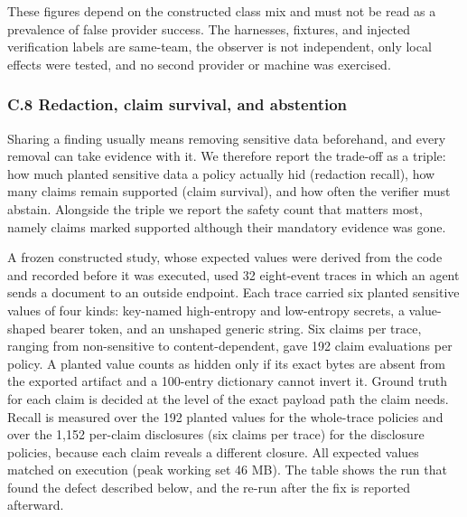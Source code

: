 \documentclass[
  american,
  10pt,
  a4paper,
]{article}
\begin{document}
These figures depend on the constructed class mix and must not be read
as a prevalence of false provider success. The harnesses, fixtures, and
injected verification labels are same-team, the observer is not
independent, only local effects were tested, and no second provider or
machine was exercised.

\subsubsection{C.8 Redaction, claim survival, and
abstention}\label{c.8-redaction-claim-survival-and-abstention}

Sharing a finding usually means removing sensitive data beforehand, and
every removal can take evidence with it. We therefore report the
trade-off as a triple: how much planted sensitive data a policy actually
hid (redaction recall), how many claims remain supported (claim
survival), and how often the verifier must abstain. Alongside the triple
we report the safety count that matters most, namely claims marked
supported although their mandatory evidence was gone.

A frozen constructed study, whose expected values were derived from the
code and recorded before it was executed, used 32 eight-event traces in
which an agent sends a document to an outside endpoint. Each trace
carried six planted sensitive values of four kinds: key-named
high-entropy and low-entropy secrets, a value-shaped bearer token, and
an unshaped generic string. Six claims per trace, ranging from
non-sensitive to content-dependent, gave 192 claim evaluations per
policy. A planted value counts as hidden only if its exact bytes are
absent from the exported artifact and a 100-entry dictionary cannot
invert it. Ground truth for each claim is decided at the level of the
exact payload path the claim needs. Recall is measured over the 192
planted values for the whole-trace policies and over the 1,152 per-claim
disclosures (six claims per trace) for the disclosure policies, because
each claim reveals a different closure. All expected values matched on
execution (peak working set 46 MB). The table shows the run that found
the defect described below, and the re-run after the fix is reported
afterward.
\end{document}
